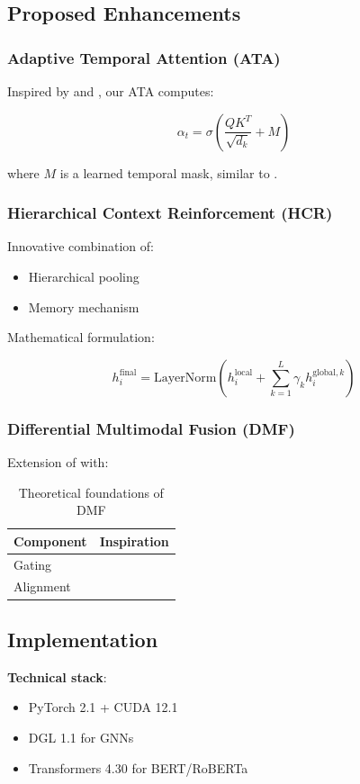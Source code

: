 \documentclass[a4paper,11pt]{article}
\begin{document}
\subsection{Proposed Enhancements}
\subsubsection{Adaptive Temporal Attention (ATA)}
Inspired by \cite{vaswani2017attention} and \cite{velickovic2017graph}, our ATA computes:

\[
\alpha_t = \sigma\left(\frac{QK^T}{\sqrt{d_k}} + M\right)
\]

where $M$ is a learned temporal mask, similar to \cite{beltagy2020longformer}.

\subsubsection{Hierarchical Context Reinforcement (HCR)}
Innovative combination of:
\begin{itemize}
    \item Hierarchical pooling \cite{yao2019graph}
    \item Memory mechanism \cite{sukhbaatar2015end}
\end{itemize}

Mathematical formulation:

\[
h_i^{\text{final}} = \text{LayerNorm}(h_i^{\text{local}} + \sum_{k=1}^L \gamma_k h_i^{\text{global},k})
\]

\subsubsection{Differential Multimodal Fusion (DMF)}
Extension of \cite{zadeh2018memory} with:

\begin{table}[h]
\centering
\begin{tabular}{ll}
\toprule
Component & Inspiration \\
\midrule
Gating & \cite{jaegle2021perceiver} \\
Alignment & \cite{alayrac2022self} \\
\bottomrule
\end{tabular}
\caption{Theoretical foundations of DMF}
\label{tab:dmf_sources}
\end{table}

\subsection{Implementation}
\textbf{Technical stack}:
\begin{itemize}
    \item PyTorch 2.1 + CUDA 12.1
    \item DGL 1.1 for GNNs
    \item Transformers 4.30 for BERT/RoBERTa
\end{itemize}
\end{document}
